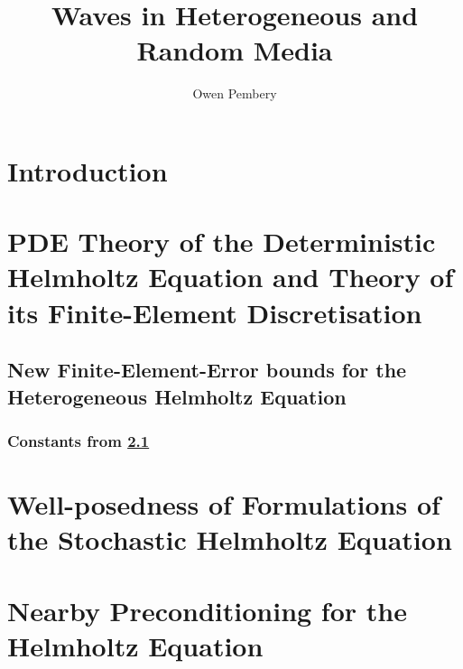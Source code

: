 \documentclass{report}
\title{Waves in Heterogeneous and Random Media}
\author{Owen Pembery}
\begin{document}
\maketitle



\tableofcontents



\chapter{Introduction}\label{chap:intro}


\chapter{PDE Theory of the Deterministic Helmholtz Equation and Theory of its Finite-Element Discretisation}\label{chap:background}


\section{New Finite-Element-Error bounds for the Heterogeneous Helmholtz Equation}\label{sec:fem}



\subsection{Constants from \cref{sec:fem}}\label{app:constants}


%

%

\chapter{Well-posedness of Formulations of the Stochastic Helmholtz Equation}\label{chap:stochastic}
 
















\chapter{Nearby Preconditioning for the Helmholtz Equation}\label{chap:nbpc}

\end{document}

